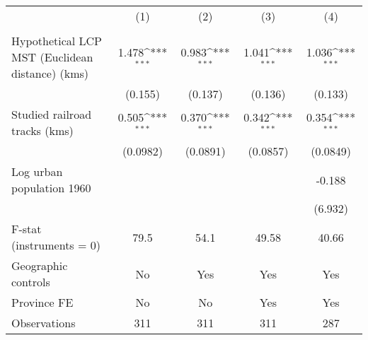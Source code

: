 {
\def\sym#1{\ifmmode^{#1}\else\(^{#1}\)\fi}
\begin{tabular}{l*{4}{c}}
\hline\hline
                &\multicolumn{1}{c}{(1)}&\multicolumn{1}{c}{(2)}&\multicolumn{1}{c}{(3)}&\multicolumn{1}{c}{(4)}\\
                &\multicolumn{1}{c}{}&\multicolumn{1}{c}{}&\multicolumn{1}{c}{}&\multicolumn{1}{c}{}\\
\hline
Hypothetical LCP MST (Euclidean distance) (kms)&    1.478\sym{***}&    0.983\sym{***}&    1.041\sym{***}&    1.036\sym{***}\\
                &  (0.155)         &  (0.137)         &  (0.136)         &  (0.133)         \\
[1em]
Studied railroad tracks (kms)&    0.505\sym{***}&    0.370\sym{***}&    0.342\sym{***}&    0.354\sym{***}\\
                & (0.0982)         & (0.0891)         & (0.0857)         & (0.0849)         \\
[1em]
Log urban population 1960&                  &                  &                  &   -0.188         \\
                &                  &                  &                  &  (6.932)         \\
\hline
F-stat (instruments = 0)&     79.5         &     54.1         &    49.58         &    40.66         \\
Geographic controls&       No         &      Yes         &      Yes         &      Yes         \\
Province FE     &       No         &       No         &      Yes         &      Yes         \\
Observations    &      311         &      311         &      311         &      287         \\
\hline\hline
\end{tabular}
}
